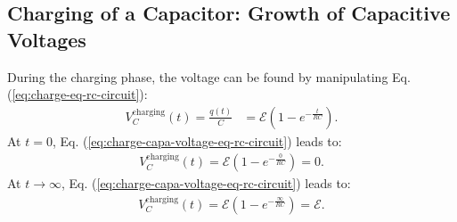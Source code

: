 \documentclass[12pt,b4paper]{article}
\begin{document}
\subsection{Charging of a Capacitor: Growth of Capacitive Voltages}
During the charging phase, the voltage can be found by manipulating Eq. (\ref{eq:charge-eq-rc-circuit}):
\begin{align}
    V_C^\text{charging}(t)=\frac{q(t)}{C}&=\mathcal{E}\left(1-e^{\displaystyle-\frac{t}{RC}}\right).\label{eq:charge-capa-voltage-eq-rc-circuit}
\end{align}
At $t=0$, Eq. (\ref{eq:charge-capa-voltage-eq-rc-circuit}) leads to:
\begin{align*}
    V_C^\text{charging}(t)=\mathcal{E}\left(1-e^{\displaystyle-\frac{0}{RC}}\right)=0.
\end{align*}
At $t\to\infty$, Eq. (\ref{eq:charge-capa-voltage-eq-rc-circuit}) leads to:
\begin{align*}
    V_C^\text{charging}(t)=\mathcal{E}\left(1-e^{\displaystyle-\frac{\infty}{RC}}\right)=\mathcal{E}.
\end{align*}
\end{document}
